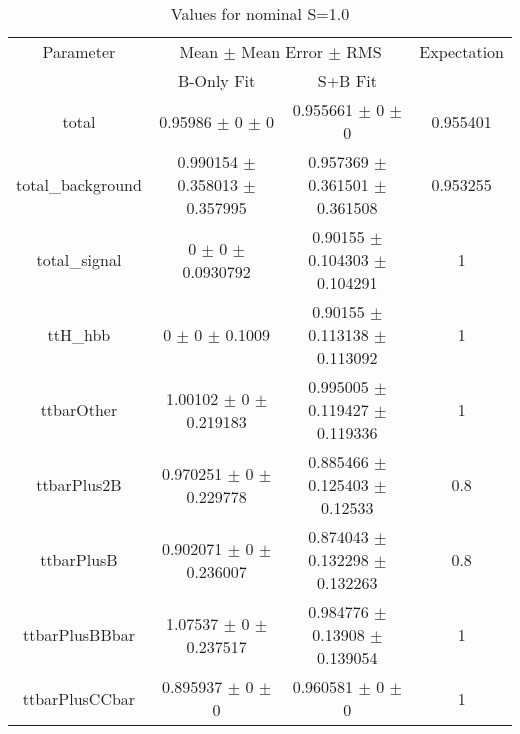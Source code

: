 \begin{table}
\centering
\caption{Values for nominal S=1.0}
\begin{tabular}{cccc}
\toprule
Parameter & \multicolumn{2}{c}{Mean $\pm$ Mean Error $\pm$ RMS} & Expectation\\
 & B-Only Fit & S+B Fit & \\
\midrule
total & \num{0.95986} $\pm$ \num{0} $\pm$ \num{0} & \num{0.955661} $\pm$ \num{0} $\pm$ \num{0} & \num{0.955401}\\
total\_background & \num{0.990154} $\pm$ \num{0.358013} $\pm$ \num{0.357995} & \num{0.957369} $\pm$ \num{0.361501} $\pm$ \num{0.361508} & \num{0.953255}\\
total\_signal & \num{0} $\pm$ \num{0} $\pm$ \num{0.0930792} & \num{0.90155} $\pm$ \num{0.104303} $\pm$ \num{0.104291} & \num{1}\\
ttH\_hbb & \num{0} $\pm$ \num{0} $\pm$ \num{0.1009} & \num{0.90155} $\pm$ \num{0.113138} $\pm$ \num{0.113092} & \num{1}\\
ttbarOther & \num{1.00102} $\pm$ \num{0} $\pm$ \num{0.219183} & \num{0.995005} $\pm$ \num{0.119427} $\pm$ \num{0.119336} & \num{1}\\
ttbarPlus2B & \num{0.970251} $\pm$ \num{0} $\pm$ \num{0.229778} & \num{0.885466} $\pm$ \num{0.125403} $\pm$ \num{0.12533} & \num{0.8}\\
ttbarPlusB & \num{0.902071} $\pm$ \num{0} $\pm$ \num{0.236007} & \num{0.874043} $\pm$ \num{0.132298} $\pm$ \num{0.132263} & \num{0.8}\\
ttbarPlusBBbar & \num{1.07537} $\pm$ \num{0} $\pm$ \num{0.237517} & \num{0.984776} $\pm$ \num{0.13908} $\pm$ \num{0.139054} & \num{1}\\
ttbarPlusCCbar & \num{0.895937} $\pm$ \num{0} $\pm$ \num{0} & \num{0.960581} $\pm$ \num{0} $\pm$ \num{0} & \num{1}\\
\bottomrule
\end{tabular}
\end{table}